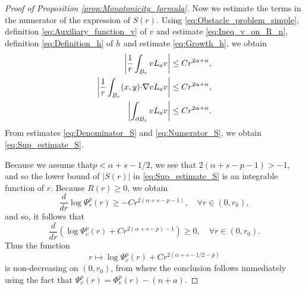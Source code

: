 \documentclass[11pt,reqno]{amsart}
\theoremstyle{definition}
\theoremstyle{remark}
\begin{document}
\begin{proof}[Proof of Proposition \ref{prop:Monotonicity_formula}]
Now we estimate the terms in the numerator of the expression of $S(r)$. Using \eqref{eq:Obstacle_problem_simple}, definition \eqref{eq:Auxiliary_function_v} of $v$ and estimate \eqref{eq:Ineq_v_on_R_n}, definition \eqref{eq:Definition_h} of $h$ and estimate \eqref{eq:Growth_h}, we obtain
\begin{equation}
\label{eq:Numerator_S}
\begin{aligned}
\left|\frac{1}{r} \int_{B_r} v L_a v\right| &\leq Cr^{2\alpha+n},\\
\left|\frac{1}{r} \int_{B_r} (x,y){\hbox{$\cdot$}} \nabla v L_a v\right| &\leq Cr^{2\alpha+n},\\
\left|\int_{\partial B_r} v L_a v\right| &\leq Cr^{2\alpha+n}.
\end{aligned}
\end{equation}
From estimates \eqref{eq:Denominator_S} and \eqref{eq:Numerator_S}, we obtain \eqref{eq:Sup_estimate_S}.

Because we assume that$p<\alpha+s-1/2$, we see that $2(\alpha+s-p-1) >-1$, and so the lower bound of $|S(r)|$ in \eqref{eq:Sup_estimate_S} is an integrable function of $r$. Because $R(r) \geq 0$, we obtain
$$
\frac{d}{dr}\log\Psi^p_v(r) \geq -C r^{2(\alpha+s-p-1)},\quad\forall r\in (0,r_0),
$$
and so, it follows that
$$
\frac{d}{dr}\left(\log\Psi^p_v(r)+C r^{2(\alpha+s-p)-1}\right) \geq 0,\quad\forall r\in (0,r_0).
$$
Thus the function 
$$
r\mapsto \log\Psi^p_v(r)+C r^{2(\alpha+s-1/2-p)}
$$
is non-decreasing on $(0,r_0)$, from where the conclusion follows immediately using the fact that $\Psi^p_v(r)=\Phi^p_v(r)-(n+a)$.
\end{proof}
\end{document}
